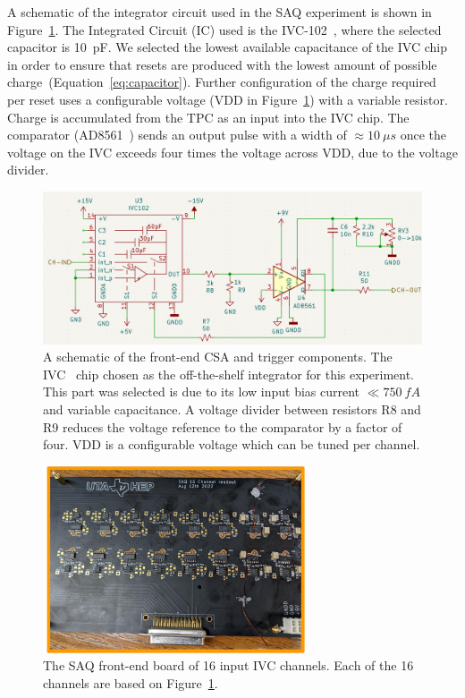 A schematic of the integrator circuit used in the SAQ experiment is shown in Figure~\ref{fig:saq_circuit_kicad}.
The Integrated Circuit (IC) used is the IVC-102~\citep{ivc_datasheet}, where the selected capacitor is 10~\unit{pF}.
We selected the lowest available capacitance of the IVC chip in order to ensure that resets are produced with the lowest amount of possible charge~(Equation~\ref{eq:capacitor}).
Further configuration of the charge required per reset uses a configurable voltage (VDD in Figure~\ref{fig:saq_circuit_kicad}) with a variable resistor.
Charge is accumulated from the TPC as an input into the IVC chip.
The comparator (AD8561~\citep{AD8561-datasheet}) sends an output pulse with a width of $\approx 10~\unit{\mu s}$ once the voltage on the IVC exceeds four times the voltage across VDD, due to the voltage divider.

\begin{figure}[]
\centering
\includegraphics[width=\textwidth]{images/saq_integrator_circuit.png}
\caption{
A schematic of the front-end CSA and trigger components.
The IVC~\citep{ivc_datasheet} chip chosen as the off-the-shelf integrator for this experiment.
This part was selected is due to its low input bias current $\ll 750~\unit{fA}$ and variable capacitance.
A voltage divider between resistors R8 and R9 reduces the voltage reference to the comparator by a factor of four.
VDD is a configurable voltage which can be tuned per channel.
}
\label{fig:saq_circuit_kicad}
\end{figure}

\begin{figure}[]
\centering
\includegraphics[width=0.7\textwidth]{images/SAQ_16_ivc_readout_board.pdf}
\caption{The SAQ front-end board of 16 input IVC channels.
Each of the 16 channels are based on Figure~\ref{fig:saq_circuit_kicad}.
}
\label{fig:saq_readout_board}
\end{figure}

